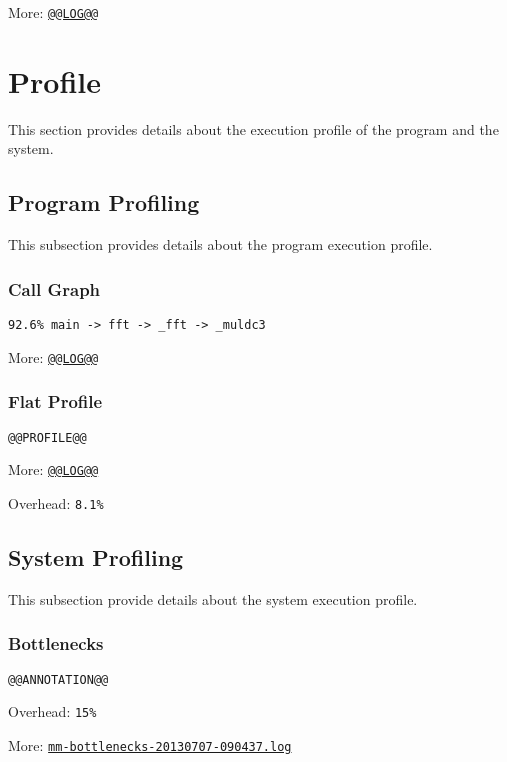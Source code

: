 \documentclass[a4paper, twocolumn]{article}
\begin{document}
More: \href{TBD}{\tt @@LOG@@}

\section{Profile}

This section provides details about the execution profile of the program and the system.

\subsection{Program Profiling}

This subsection provides details about the program execution profile.

\subsubsection{Call Graph}

\begin{verbatim}
92.6% main -> fft -> _fft -> _muldc3
\end{verbatim}

More: \href{TBD}{\tt @@LOG@@}

\subsubsection{Flat Profile}

\begin{verbatim}
@@PROFILE@@
\end{verbatim}

More: \href{TBD}{\tt @@LOG@@}

Overhead: {\tt 8.1\%}

\subsection{System Profiling}

This subsection provide details about the system execution profile.

\subsubsection{Bottlenecks}

\begin{verbatim}
@@ANNOTATION@@
\end{verbatim}

Overhead: {\tt 15\%}

More: \href{TBD}{\tt mm-bottlenecks-20130707-090437.log}
\end{document}
